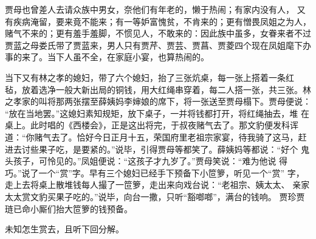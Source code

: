 贾母也曾差人去请众族中男女，奈他们有年老的，懒于热闹；有家内没有人，
又有疾病淹留，要来竟不能来；有一等妒富愧贫，不肯来的；更有憎畏凤姐之为人，
赌气不来的；更有羞手羞脚，不惯见人，不敢来的：因此族中虽多，女眷来者不过
贾蓝之母娄氏带了贾蓝来，男人只有贾芹、贾芸、贾菖、贾菱四个现在凤姐麾下办
事的来了。当下人虽不全，在家庭小宴，也算热闹的。

当下又有林之孝的媳妇，带了六个媳妇，抬了三张炕桌，每一张上搭着一条红
毡，放着选净一般大新出局的铜钱，用大红绳串穿着，每二人搭一张，共三张。林
之孝家的叫将那两张摆至薛姨妈李婶娘的席下，将一张送至贾母榻下。贾母便说：
“放在当地罢。”这媳妇素知规矩，放下桌子，一并将钱都打开，将红绳抽去，堆
在桌上。此时唱的《西楼会》，正是这出将完，于叔夜赌气去了。那文豹便发科诨
道：“你赌气去了。恰好今日正月十五，荣国府里老祖宗家宴，待我骑了这马，赶
进去讨些果子吃，是要紧的。”说毕，引得贾母等都笑了。薛姨妈等都说：“好个
鬼头孩子，可怜见的。”凤姐便说：“这孩子才九岁了。”贾母笑说：“难为他说
得巧。”说了一个“赏”字。早有三个媳妇已经手下预备下小笸箩，听见一个“赏”
字，走上去将桌上散堆钱每人撮了一笸箩，走出来向戏台说：“老祖宗、姨太太、
亲家太太赏文豹买果子吃的。”说毕，向台一撒，只听“豁啷啷”，满台的钱响。
贾珍贾琏已命小厮们抬大笸箩的钱预备。

未知怎生赏去，且听下回分解。